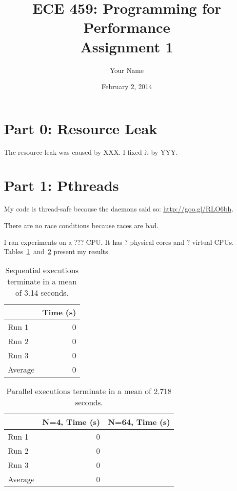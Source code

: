 \documentclass[12pt]{article}
\title{ECE 459: Programming for Performance\\Assignment 1}
\author{Your Name}
\date{February 2, 2014}
\newcommand{\physicalcores}{?}
\newcommand{\virtualcpus}{?}
\begin{document}
\maketitle

\section*{Part 0: Resource Leak}

The resource leak was caused by XXX. I fixed it by YYY.

\section*{Part 1: Pthreads}

My code is thread-safe because the daemons said so: \url{http://goo.gl/RLO6bh}. 

There are no race conditions because races are bad.

I ran experiments on a ??? CPU. It has \physicalcores{} physical cores and \virtualcpus{} virtual
CPUs. Tables~\ref{tbl_sequential}~and~\ref{tbl_parallel} present my results.

\begin{table}[H]
  \centering
  \begin{tabular}{lr}
    & {\bf Time (s)} \\
    \hline
    Run 1 & 0 \\
    Run 2 & 0 \\
    Run 3 & 0 \\
    \hline
    Average & 0 \\
  \end{tabular}
  \caption{\label{tbl_sequential}Sequential executions terminate in a mean of 3.14 seconds.}
\end{table}

\begin{table}[H]
  \centering
  \begin{tabular}{lrr}
    & {\bf N=4, Time (s)} & {\bf N=64, Time (s)} \\
    \hline
    Run 1 & 0 \\
    Run 2 & 0 \\
    Run 3 & 0 \\
    \hline
    Average & 0 \\
  \end{tabular}
  \caption{\label{tbl_parallel}Parallel executions terminate in a mean of 2.718 seconds.}
\end{table}
\end{document}
